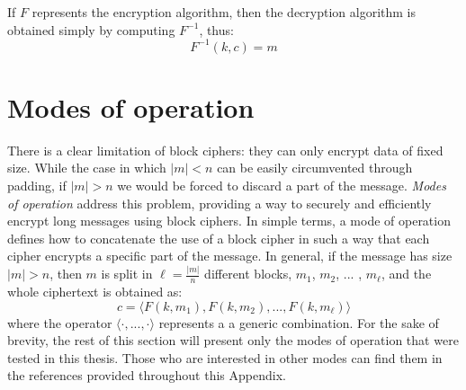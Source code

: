 \documentclass[12pt,a4paper]{book}
\theoremstyle{definition}
\begin{document}
	If $F$ represents the encryption algorithm, then the decryption algorithm is obtained simply by computing $F^{-1}$, thus:
	\[
		F^{-1}(k,c) = m
	\]

	\section{Modes of operation}\label{sec:modes}
	There is a clear limitation of block ciphers: they can only encrypt data of fixed size. While the case in which $|m| < n$ can be easily circumvented through padding, if $|m| > n$ we would be forced to discard a part of the message. \textit{Modes of operation} address this problem, providing a way to securely and efficiently encrypt long messages using block ciphers. In simple terms, a mode of operation defines how to concatenate the use of a block cipher in such a way that each cipher encrypts a specific part of the message. In general, if the message has size $|m| > n$, then $m$ is split in $\ell = \frac{|m|}{n}$ different blocks, $m_1$, $m_2$, ... , $m_{\ell}$, and the whole ciphertext is obtained as:
	\[
	c = \langle F(k, m_1), F(k, m_2), ..., F(k, m_{\ell})\rangle
	\]
	where the operator $\langle \cdot , ..., \cdot \rangle$ represents a a generic combination. For the sake of brevity, the rest of this section will present only the modes of operation that were tested in this thesis. Those who are interested in other modes can find them in the references provided throughout this Appendix.
\end{document}
